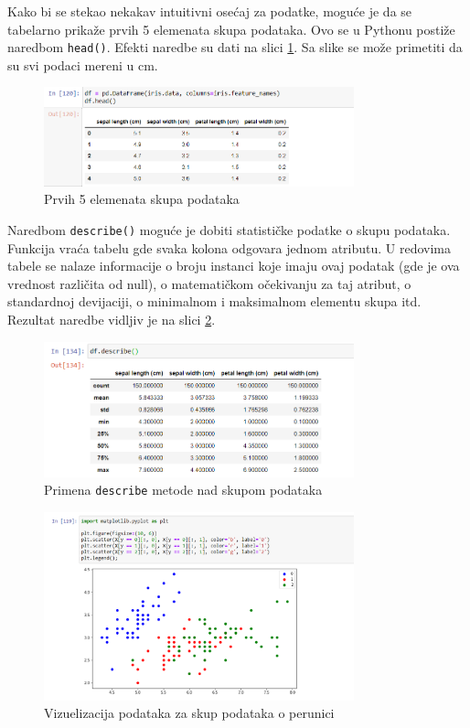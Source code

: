 \documentclass[a4paper,12pt]{report}
\begin{document}
Kako bi se stekao nekakav intuitivni osećaj za podatke, moguće je da se tabelarno prikaže prvih 5 elemenata skupa podataka. Ovo se u Pythonu postiže naredbom \texttt{head()}. Efekti naredbe su dati na slici \ref{fig:irishead}. Sa slike se može primetiti da su svi podaci mereni u cm.   
\begin{figure}[h]
    \centering
    \includegraphics[width=0.8\textwidth]{iris_head.png}
    \caption{Prvih 5 elemenata skupa podataka}\label{fig:irishead}
\end{figure}

Naredbom \texttt{describe()} moguće je dobiti statističke podatke o skupu podataka. Funkcija vraća tabelu gde svaka kolona odgovara jednom atributu. U redovima tabele se nalaze informacije o broju instanci koje imaju ovaj podatak (gde je ova vrednost različita od null), o matematičkom očekivanju za taj atribut, o standardnoj devijaciji, o minimalnom i maksimalnom elementu skupa itd. Rezultat naredbe vidljiv je na slici \ref{fig:irisdescribe}.
\begin{figure}[h]
    \centering
    \includegraphics[width=0.8\textwidth]{iris_describe.png}
    \caption{Primena \texttt{describe} metode nad skupom podataka}\label{fig:irisdescribe}
\end{figure}

\begin{figure}[h]
    \centering
    \includegraphics[width=0.8\textwidth]{iris_3_scatter.png}
    \caption{Vizuelizacija podataka za skup podataka o perunici}\label{fig:irisscatter}
\end{figure}
\end{document}
